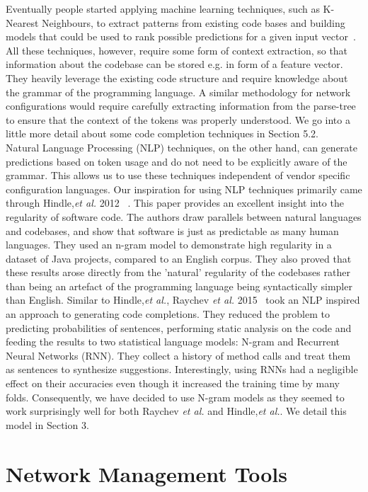 \documentclass[../thesis.tex]{subfiles}
\begin{document}
Eventually people started applying machine learning techniques, such as K-Nearest Neighbours, to extract patterns from existing code bases and building models that could be used to rank possible predictions for a given input vector~\cite{bruch}. All these techniques, however, require some form of context extraction, so that information about the codebase can be stored e.g. in form of a feature vector. They heavily leverage the existing code structure and require knowledge about the grammar of the programming language. A similar methodology for network configurations would require carefully extracting information from the parse-tree to ensure that the context of the tokens was properly understood. We go into a little more detail about some code completion techniques in Section 5.2.\\

Natural Language Processing (NLP) techniques, on the other hand, can generate predictions based on token usage and do not need to be explicitly aware of the grammar. This allows us to use these techniques independent of vendor specific configuration languages. Our inspiration for using NLP techniques primarily came through Hindle,\textit{et al.} 2012 ~\cite{naturalness}. This paper provides an excellent insight into the regularity of software code. The authors draw parallels between natural languages and codebases, and show that software is just as predictable as many human languages. They used an n-gram model to demonstrate high regularity in a dataset of Java projects, compared to an English corpus. They also proved that these results arose directly from the 'natural' regularity of the codebases rather than being an artefact of the programming language being syntactically simpler than English. Similar to Hindle,\textit{et al.}, Raychev \textit{et al.} 2015~\cite{raychev} took an NLP inspired an approach to generating code completions. They reduced the problem to predicting probabilities of sentences, performing static analysis on the code and feeding the results to two statistical language models: N-gram and Recurrent Neural Networks (RNN). They collect a history of method calls and treat them as sentences to synthesize suggestions. Interestingly, using RNNs had a negligible effect on their accuracies even though it increased the training time by many folds. Consequently, we have decided to use N-gram models as they seemed to work surprisingly well for both Raychev \textit{et al.} and Hindle,\textit{et al.}. We detail this model in Section 3.

\section{Network Management Tools}
\end{document}
